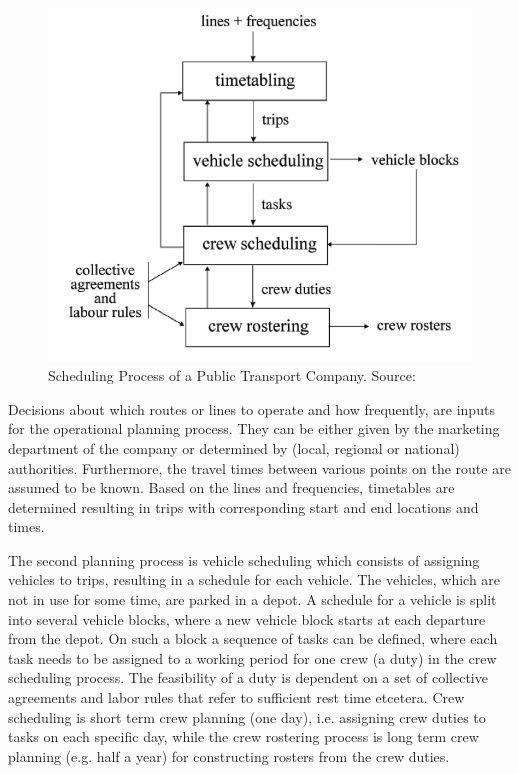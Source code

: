 \begin {figure} [h!]
\centering
\includegraphics {genericSchedulingProcess}
\caption [Scheduling Process of a Public Transport Company] {Scheduling Process of a Public Transport Company. Source: \cite{Huisman2004}}
\label {image-genericSchedulingProcess}
\end {figure}

Decisions about which routes or lines to operate and how frequently, are inputs for the operational planning process. They can be either given by the marketing department of the company or determined by (local, regional or national) authorities. Furthermore, the travel times between various points on the route are assumed to be known. Based on the lines and frequencies, timetables are determined resulting in trips with corresponding start and end locations and times.

The second planning process is vehicle scheduling which consists of assigning vehicles to trips, resulting in a schedule for each vehicle. The vehicles, which are not in use for some time, are parked in a depot. A schedule for a vehicle is split into several vehicle blocks, where a new vehicle block starts at each departure from the depot. On such a block a sequence of tasks can be defined, where each task needs to be assigned to a working period for one crew (a duty) in the crew scheduling process. The feasibility of a duty is dependent on a set of collective agreements and labor rules that refer to sufficient rest time etcetera. Crew scheduling is short term crew planning (one day), i.e. assigning crew duties to tasks on each specific day, while the crew rostering process is long term crew planning (e.g. half a year) for constructing rosters from the crew duties.

